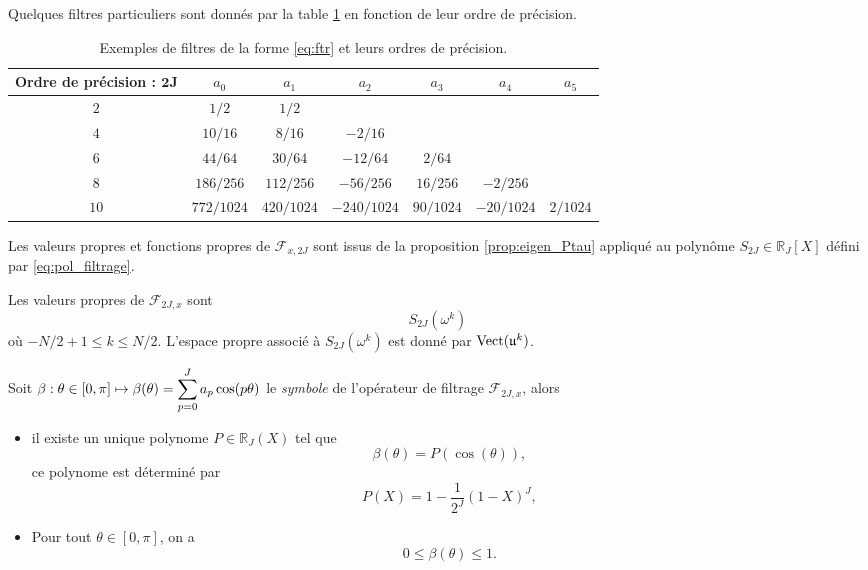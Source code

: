 Quelques filtres particuliers sont donnés par la table \ref{tab:filter} en fonction de leur ordre de précision.
\begin{table}[htbp]
\begin{center}
\begin{tabular}{|c||cccccc|}
\hline
\textbf{Ordre de précision : }$\mathbf{2J}$ & $a_0$ & $a_1$ & $a_2$ & $a_3$ & $a_4$ & $a_5$ \\
\hline \hline
$2$ & $1/2$ & $1/2$ & & & & \\
\hline
$4$ & $10/16$ & $8/16$ & $-2/16$ & & & \\
\hline
$6$ & $44/64$ & $30/64$ & $-12/64$ & $2/64$ & & \\
\hline
$8$ & $186/256$ & $112/256$ & $-56/256$ & $16/256$ & $-2/256$ & \\
\hline
$10$ & $772/1024$ & $420/1024$ & $-240/1024$ & $90/1024$ & $-20/1024$ & $2/1024$ \\
\hline
\end{tabular}
\end{center}
\caption{Exemples de filtres de la forme \eqref{eq:ftr} et leurs ordres de précision.}
\label{tab:filter}
\end{table}

Les valeurs propres et fonctions propres de $\mathcal{F}_{x,2J}$ sont issus de la proposition \ref{prop:eigen_Ptau} appliqué au polynôme $S_{2J} \in \mathbb{R}_J [X]$ défini par \eqref{eq:pol_filtrage}.

\begin{proposition}
Les valeurs propres de $\mathcal{F}_{2J,x}$ sont 
\begin{equation}
S_{2J} (\omega^k)
\end{equation}
où $-N/2+1 \leq k \leq N/2$. L'espace propre associé à $S_{2J} (\omega^k)$ est donné par $\text{Vect}( \mathfrak{u}^k )$.
\label{prop:eigen_filtre}
\end{proposition}

\begin{theoreme}
Soit $\beta : \theta \in [0, \pi] \mapsto \beta(\theta) = \displaystyle\sum\limits_{p=0}^J a_p \cos (p \theta)$ le \textit{symbole} de l'opérateur de filtrage $\mathcal{F}_{2J,x}$, alors
\begin{itemize}
\item il existe un unique polynome $P \in \mathbb{R}_{J}(X)$ tel que
\begin{equation}
\beta(\theta) = P(\cos (\theta)),
\end{equation}
ce polynome est déterminé par
\begin{equation}
P(X) = 1 - \dfrac{1}{2^J}(1-X)^J,
\end{equation}
\item Pour tout $\theta \in [0, \pi]$, on a
\begin{equation}
0 \leq \beta(\theta) \leq 1.
\end{equation}
\end{itemize}
\label{th:filtre_dissipatif}
\end{theoreme}

